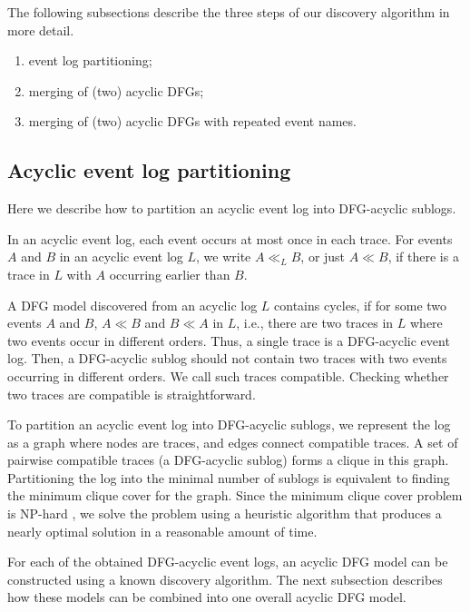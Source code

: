 \documentclass[11pt]{article}
\theoremstyle{definition}
\begin{document}
The following subsections describe the three steps of our discovery algorithm in more detail.
\begin{enumerate}
    \item event log partitioning;
    \item merging of (two) acyclic DFGs;
    \item merging of (two) acyclic DFGs with repeated event names.
\end{enumerate}

\subsection{Acyclic event log partitioning}\label{sec:log_part}
Here we describe how to partition an acyclic event log into DFG-acyclic sublogs.

In an acyclic event log, each event occurs at most once in each trace. For events $A$ and $B$ in an acyclic event log $L$,  we write $A \ll_L B$, or just $A \ll B$, if there is a trace in $L$ with $A$ occurring earlier than $B$.

A DFG model discovered from an acyclic log $L$ contains cycles, if for some two events $A$ and $B$, $A \ll B$ and $B \ll A$ in $L$, i.e., there are two traces in $L$ where two events occur in different orders.
Thus, a single trace is a DFG-acyclic event log. 
Then, a DFG-acyclic sublog should not contain two traces with two events occurring in different orders. We call such traces compatible. Checking whether two traces are compatible is straightforward.

To partition an acyclic event log into DFG-acyclic sublogs, we represent the log as a graph where nodes are traces, and edges connect compatible traces. 
A set of pairwise compatible traces (a DFG-acyclic sublog) forms a clique in this graph. 
Partitioning the log into the minimal number of sublogs is equivalent to finding the minimum clique cover for the graph. 
Since the minimum clique cover problem is NP-hard \citep{Karp1972-la}, we solve the problem using a heuristic algorithm that produces a nearly optimal solution in a reasonable amount of time.

For each of the obtained DFG-acyclic event logs, an acyclic DFG model can be constructed using a known discovery algorithm. 
The next subsection describes how these models can be combined into one overall acyclic DFG model.


\end{document}
